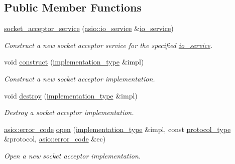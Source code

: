 \subsection*{Public Member Functions}
\begin{DoxyCompactItemize}
\item 
\hyperlink{classasio_1_1socket__acceptor__service_a9de4194ef8c45834615c972c89981375}{socket\+\_\+acceptor\+\_\+service} (\hyperlink{classasio_1_1io__service}{asio\+::io\+\_\+service} \&\hyperlink{classasio_1_1io__service}{io\+\_\+service})
\begin{DoxyCompactList}\small\item\em Construct a new socket acceptor service for the specified \hyperlink{classasio_1_1io__service}{io\+\_\+service}. \end{DoxyCompactList}\item 
void \hyperlink{classasio_1_1socket__acceptor__service_ad7b7e65bf63ec344fddb1ab9a59b154b}{construct} (\hyperlink{classasio_1_1socket__acceptor__service_ae91b355a38c59424f68df71fcd9fffb8}{implementation\+\_\+type} \&impl)
\begin{DoxyCompactList}\small\item\em Construct a new socket acceptor implementation. \end{DoxyCompactList}\item 
void \hyperlink{classasio_1_1socket__acceptor__service_a3b2c2805f76d1f055596012093e545f2}{destroy} (\hyperlink{classasio_1_1socket__acceptor__service_ae91b355a38c59424f68df71fcd9fffb8}{implementation\+\_\+type} \&impl)
\begin{DoxyCompactList}\small\item\em Destroy a socket acceptor implementation. \end{DoxyCompactList}\item 
\hyperlink{classasio_1_1error__code}{asio\+::error\+\_\+code} \hyperlink{classasio_1_1socket__acceptor__service_a73a33df8aa20b50834834e6387b079c9}{open} (\hyperlink{classasio_1_1socket__acceptor__service_ae91b355a38c59424f68df71fcd9fffb8}{implementation\+\_\+type} \&impl, const \hyperlink{classasio_1_1socket__acceptor__service_a2622e1b415ef0257f92e1d586cc25641}{protocol\+\_\+type} \&protocol, \hyperlink{classasio_1_1error__code}{asio\+::error\+\_\+code} \&ec)
\begin{DoxyCompactList}\small\item\em Open a new socket acceptor implementation. \end{DoxyCompactList}\item 

\end{DoxyCompactItemize}
